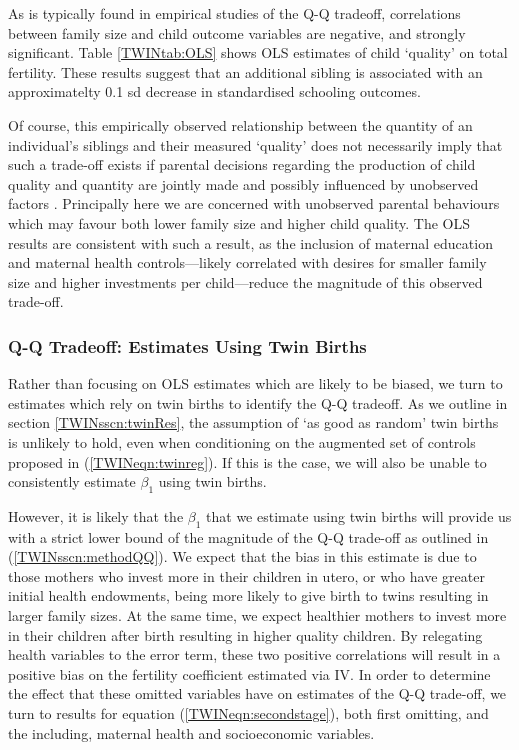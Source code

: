 As is typically found in empirical studies of the Q-Q tradeoff, correlations 
between family size and child outcome variables are negative, and strongly 
significant. Table \ref{TWINtab:OLS} shows OLS estimates of child `quality' on
total fertility. These results suggest that an additional sibling is associated
with an approximatelty 0.1 sd decrease in standardised schooling outcomes.

Of course, this empirically observed relationship between the quantity of an 
individual's siblings and their measured `quality' does not necessarily imply 
that such a trade-off exists if parental decisions regarding the production of 
child quality and quantity are jointly made and possibly influenced by unobserved
factors \citep{BeckerTomes1976}.  Principally here we are concerned with 
unobserved parental behaviours which may favour both lower family size and higher 
child quality.  The OLS results are consistent with such a result, as the 
inclusion of maternal education and maternal health controls---likely correlated 
with desires for smaller family size and higher investments per child---reduce the 
magnitude of this observed trade-off.

\subsubsection{Q-Q Tradeoff: Estimates Using Twin Births}
Rather than focusing on OLS estimates which are likely to be biased, we turn 
to estimates which rely on twin births to identify the Q-Q tradeoff.  As we 
outline in section \ref{TWINsscn:twinRes}, the assumption of `as good as random' 
twin births is unlikely to hold, even when conditioning on the augmented set of 
controls proposed in (\ref{TWINeqn:twinreg}).  If this is the case, we will 
also be unable to consistently estimate $\beta_1$ using twin births.

However, it is likely that the $\beta_1$ that we estimate using twin births will 
provide us with a strict lower bound of the magnitude of the Q-Q trade-off as
outlined in (\ref{TWINsscn:methodQQ}). We expect that the bias in this estimate 
is due to those mothers who invest more in their children in utero, or who have
greater initial health endowments, being more likely to give birth to twins 
resulting in larger family sizes.  At the same time, we expect healthier mothers 
to invest more in their children after birth resulting in higher quality children.
By relegating health variables to the error term, these two positive correlations 
will result in a positive bias on the fertility coefficient estimated via IV.  In 
order to determine the effect that these omitted variables have on estimates of 
the Q-Q trade-off, we turn to results for equation (\ref{TWINeqn:secondstage}), 
both first omitting, and the including, maternal health and socioeconomic 
variables.

